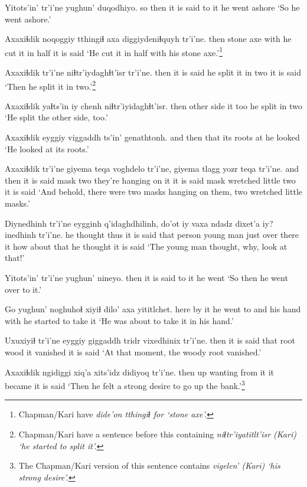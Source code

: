 \documentclass[12pt]{article}
\begin{document}
\gll Yitots'in' tr'i'ne yughun' duqodhiyo.
{so then}  {it is said} {to it} {he went ashore}
\glt `So he went ashore.'
\glend

\gll Axaxiɬdik noqoggiy tthingiɬ axa diggiydeniɬquyh tr'i'ne.
then  stone axe with {he cut it in half} {it is said}
\glt `He cut it in half with his stone axe.'\footnote{Chapman/Kari have \em dide'on tthingiɬ \em for `stone axe'.}
\glend

\gll Axaxiɬdik tr'i'ne niɬtr'iydaghɬt'isr  tr'i'ne.
then  {it is said} {he split it in two} {it is said}
\glt `Then he split it in two.'\footnote{Chapman/Kari have a sentence before this containing \em niɬtr'iyatitlt'isr \em (Kari) `he started to split it'.}
\glend


\gll Axaxiɬdik yaɬts'in iy chenh niɬtr'iyidaghɬt'isr.
then  {other side} it too {he split in two}
\glt `He split the other side, too.'
\glend

\gll Axaxiɬdik eyggiy  viggaddh ts'in' genathtonh.
{and then} that {its roots} at {he looked}
\glt `He looked at its roots.'
\glend

\gll Axaxiɬdik tr'i'ne giyema teqa voghdelo tr'i'ne, giyema tlagg  yozr teqa tr'i'ne.
{and then} {it is said} mask two {they're hanging on it} {it is said} mask wretched little two {it is said}
\glt `And behold, there were two masks hanging on them, two wretched little masks.'
\glend

\gll Diynedhinh tr'i'ne eygginh q'idaghdhilinh, do'ot iy {vaxa ndadz dixet'a iy?} inedhinh tr'i'ne.
{he thought thus} {it is said} {that person} {young man} {just over there} it {how about that} {he thought} {it is said}
\glt `The young man thought, why, look at that!'
\glend

\gll Yitots'in' tr'i'ne yughun' nineyo.
then  {it is said} {to it} {he went}
\glt `So then he went over to it.'
\glend

\gll Go yughun' noghuhoɬ xiyiɬ dilo'  axa yititlchet.
here {by it} {he went to} and {his hand} with {he started to take it}
\glt `He was about to take it in his hand.'
\glend

\gll Uxuxiyiɬ tr'i'ne eyggiy  giggaddh tridr vixedhinix tr'i'ne.
then  {it is said} that root wood {it vanished} {it is said}
\glt `At that moment, the woody root vanished.'
\glend

\gll Axaxiɬdik ngidiggi xiq'a xits'idz didiyoq tr'i'ne.
then  up  wanting {from it} {it became} {it is said}
\glt `Then he felt a strong desire to go up the bank.'\footnote{The Chapman/Kari version of this sentence contains \em vigelen' \em (Kari) `his strong desire'.}
\glend
\end{document}
